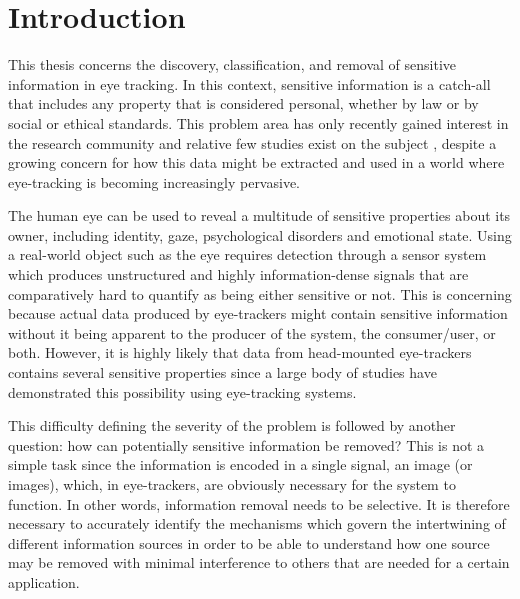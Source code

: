 \chapter{Introduction}
This thesis concerns the discovery, classification, and removal of sensitive information in eye tracking. In this context, sensitive information is a catch-all that includes any property that is considered personal, whether by law or by social or ethical standards. This problem area has only recently gained interest in the research community and relative few studies exist on the subject \parencite{BRENDAN_ARTICLE, BRENDAN_SNOW, differential-general, differential-general-two, privaceye}, despite a growing concern for how this data might be extracted and used in a world where eye-tracking is becoming increasingly pervasive. 

The human eye can be used to reveal a multitude of sensitive properties about its owner, including identity, gaze, psychological disorders and emotional state. Using a real-world object such as the eye requires detection through a sensor system which produces unstructured and highly information-dense signals that are comparatively hard to quantify as being either sensitive or not. This is concerning because actual data produced by eye-trackers might contain sensitive information without it being apparent to the producer of the system, the consumer/user, or both. However, it is highly likely that data from head-mounted eye-trackers contains several sensitive properties since a large body of studies have demonstrated this possibility using eye-tracking systems.

This difficulty defining the severity of the problem is followed by another question: how can potentially sensitive information be removed? This is not a simple task since the information is encoded in a single signal, an image (or images), which, in eye-trackers, are obviously necessary for the system to function. In other words, information removal needs to be selective. It is therefore necessary to accurately identify the mechanisms which govern the intertwining of different information sources in order to be able to understand how one source may be removed with minimal interference to others that are needed for a certain application.

